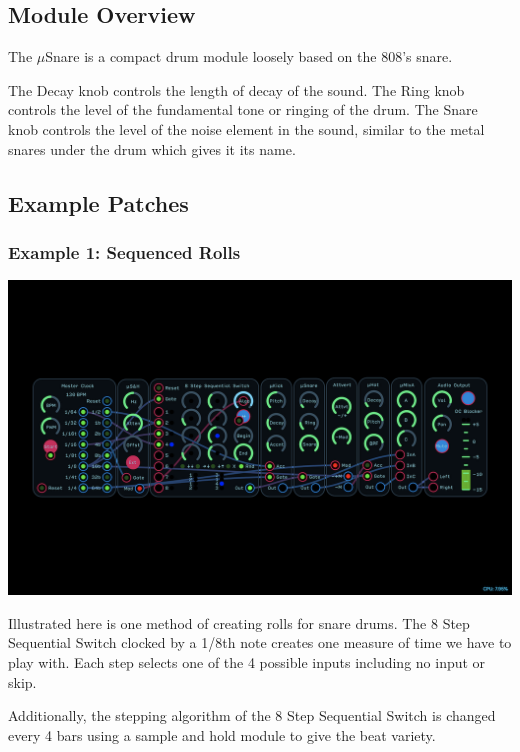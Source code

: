 \documentclass[11pt]{book}
\begin{document}
\begin{multicols*}{2}

\subsection*{Module Overview}

The $\mu$Snare is a compact drum module loosely based on the 808's snare.

The Decay knob controls the length of decay of the sound. The Ring knob controls the level of the fundamental tone or ringing of the drum. The Snare knob controls the level of the noise element in the sound, similar to the metal snares under the drum which gives it its name.

\subsection*{Example Patches}

\subsubsection*{Example 1: Sequenced Rolls}

\begin{center}
\includegraphics[width=0.95\linewidth]{usnare-fig1.png}
\end{center}

Illustrated here is one method of creating rolls for snare drums. The 8 Step Sequential Switch clocked by a 1/8th note creates one measure of time we have to play with. Each step selects one of the 4 possible inputs including no input or skip.

Additionally, the stepping algorithm of the 8 Step Sequential Switch is changed every 4 bars using a sample and hold module to give the beat variety.

\end{multicols*}
\end{document}
